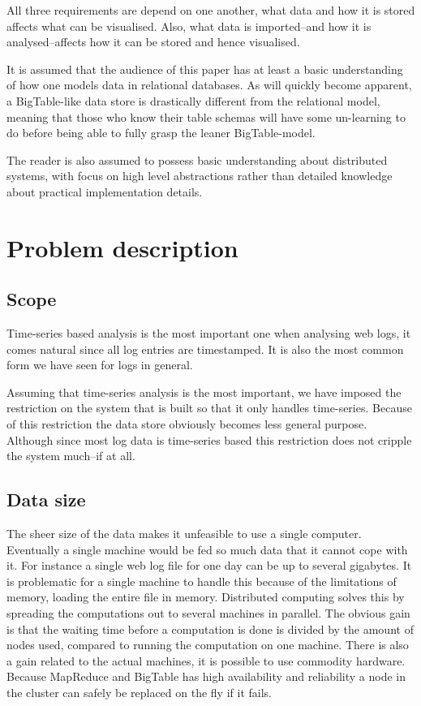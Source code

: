 \documentclass[a4paper,10pt]{book}
\begin{document}
All three requirements are depend on one another, what data and how it is
stored affects what can be visualised. Also, what data is imported--and
how it is analysed--affects how it can be stored and hence visualised.

It is assumed that the audience of this paper has at least a basic
understanding of how one models data in relational databases. As will
quickly become apparent, a BigTable-like \cite{bigtable} data store is
drastically different from the relational model, meaning that those who
know their table schemas will have some un-learning to do before being able
to fully grasp the leaner BigTable-model.

The reader is also assumed to possess basic understanding about distributed
systems, with focus on high level abstractions rather than detailed
knowledge about practical implementation details.



\section{Problem description}

\subsection{Scope}

Time-series based analysis is the most important one when analysing web
logs, it comes natural since all log entries are timestamped.
\cite{discoveringweb} It is also the most common form we have seen for logs
in general.

Assuming that time-series analysis is the most important, we have imposed
the restriction on the system that is built so that it only handles
time-series. Because of this restriction the data store obviously becomes
less general purpose. Although since most log data is time-series based
this restriction does not cripple the system much--if at all.



\subsection{Data size}

The sheer size of the data makes it unfeasible to use a single computer.
Eventually a single machine would be fed so much data that it cannot cope
with it. For instance a single web log file for one day can be up to
several gigabytes. It is problematic for a single machine to handle this
because of the limitations of memory, loading the entire file in memory.
Distributed computing solves this by spreading the computations out to
several machines in parallel. The obvious gain is that the waiting time
before a computation is done is divided by the amount of nodes used,
compared to running the computation on one machine. There is also a gain
related to the actual machines, it is possible to use commodity hardware.
Because MapReduce and BigTable has high availability and reliability a node
in the cluster can safely be replaced on the fly if it fails.
\end{document}
